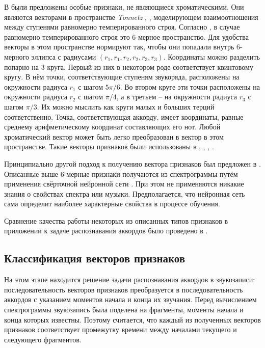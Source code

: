 В \cite{Harte2006} были предложены особые признаки, не являющиеся
хроматическими. Они являются векторами в пространстве \emph{Tonnetz}
\cite{Cohn1998}, \cite{Chew2000}, моделирующем взаимоотношения между ступенями
равномерно темперированного строя. Согласно \cite{Harte2006}, в случае
равномерно темперированного строя это 6-мерное пространство. Для удобства
векторы в этом пространстве нормируют так, чтобы они попадали внутрь 6-мерного
эллипса с радиусами $(r_1, r_1, r_2, r_2, r_3, r_3)$. Координаты можно разделить
попарно на 3 круга. Первый из них в некотором роде соответствует квинтовому
кругу. В нём точки, соответствующие ступеням звукоряда, расположены на
окружности радиуса $r_1$ с шагом $5\pi / 6$. Во втором круге эти точки
расположены на окружности радиуса $r_2$ с шагом $\pi/4$, а в третьем -- на
окружности радиуса $r_3$ с шагом $\pi/3$. Их можно мыслить как круги малых и
больших терций соответственно. Точка, соответствующая аккорду, имеет координаты,
равные среднему арифметическому координат составляющих его нот. Любой
хроматический вектор может быть легко преобразован в вектор в этом пространстве.
Такие векторы признаков были использованы в \cite{Lee2007}, \cite{Lee2008},
\cite{Chen2012}, \cite{Humphrey2012}.

Принципиально другой подход к получению вектора признаков был предложен в
\cite{Humphrey2012}. Описанные выше 6-мерные признаки получаются из
спектрограммы путём применения свёрточной нейронной сети \cite{LeCun1998}. При
этом не применяются никакие знания о свойствах спектра или музыки.
Предполагается, что нейронная сеть сама определит наиболее характерные свойства
в процессе обучения.

Сравнение качества работы некоторых из описанных типов признаков в приложении к
задаче распознавания аккордов было проведено в \cite{Jiang2011}.

\subsection{Классификация векторов признаков}
\label{ssectT_post}

На этом этапе находится решение задачи распознавания аккордов в звукозаписи:
последовательность векторов признаков преобразуется в последовательность
аккордов с указанием моментов начала и конца их звучания. Перед вычислением
спектрограммы звукозапись была поделена на фрагменты, моменты начала и конца
которых известны. Поэтому считается, что каждый из полученных векторов признаков
соответствует промежутку времени между началами текущего и следующего
фрагментов.

